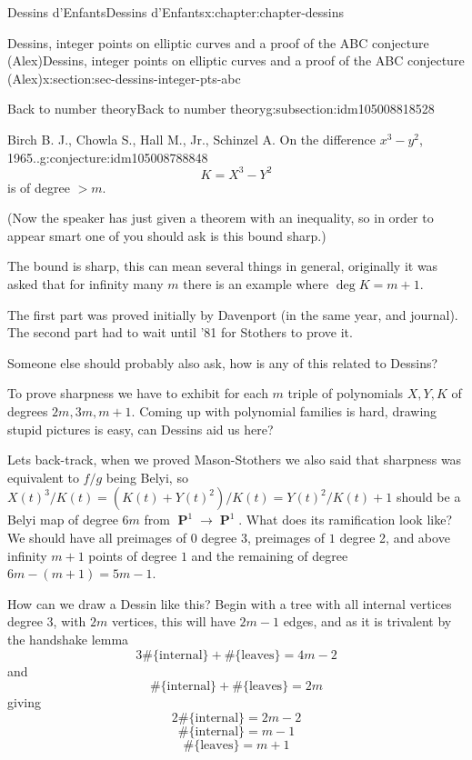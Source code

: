 \documentclass[oneside,10pt,]{book}
\numberwithin{equation}{section}
\DeclareMathOperator{\PP}{\mathbf{P}}
\newcommand{\gt}{>}
\begin{document}
\begin{chapterptx}{Dessins d'Enfants}{}{Dessins d'Enfants}{}{}{x:chapter:chapter-dessins}
\begin{sectionptx}{Dessins, integer points on elliptic curves and a proof of the ABC conjecture (Alex)}{}{Dessins, integer points on elliptic curves and a proof of the ABC conjecture (Alex)}{}{}{x:section:sec-dessins-integer-pts-abc}
\begin{subsectionptx}{Back to number theory}{}{Back to number theory}{}{}{g:subsection:idm105008818528}
\begin{conjecture}{Birch B. J., Chowla S., Hall M., Jr., Schinzel A. On the difference \(x^3 - y^2\), 1965..}{}{g:conjecture:idm105008788848}
\begin{equation*}
K = X^3 - Y^2
\end{equation*}
is of degree \(\gt m\).%
\par
(Now the speaker has just given a theorem with an inequality, so in order to appear smart one of you should ask is this bound sharp.)%
\par
The bound is sharp, this can mean several things in general, originally it was asked that for infinity many \(m\) there is an example where \(\deg K = m + 1\).%
\end{conjecture}
The first part was proved initially by Davenport (in the same year, and journal). The second part had to wait until '81 for Stothers to prove it.%
\par
Someone else should probably also ask, how is any of this related to Dessins?%
\par
To prove sharpness we have to exhibit for each \(m\) triple of polynomials \(X,Y,K\) of degrees \(2m,3m,m+1\). Coming up with polynomial families is hard, drawing stupid pictures is easy, can Dessins aid us here?%
\par
Lets back-track, when we proved Mason-Stothers we also said that sharpness was equivalent to \(f/g\) being Belyi, so \(X(t)^3/K(t) = (K(t) + Y(t)^2) / K(t) = Y(t)^2/K(t) + 1\) should be a Belyi map of degree \(6m\) from \(\PP^1\to \PP^1\). What does its ramification look like? We should have all preimages of \(0\) degree 3, preimages of \(1\) degree 2, and above infinity \(m + 1\) points of degree \(1\) and the remaining of degree \(6m - (m + 1) = 5m - 1\).%
\par
How can we draw a Dessin like this? Begin with a tree with all internal vertices degree 3, with \(2m\) vertices, this will have \(2m - 1\) edges, and as it is trivalent by the handshake lemma%
\begin{equation*}
3 \#\{\text{internal}\} + \#\{\text{leaves}\} =  4m - 2
\end{equation*}
and%
\begin{equation*}
\#\{\text{internal}\} + \#\{\text{leaves}\} =  2m
\end{equation*}
giving%
\begin{equation*}
2\#\{\text{internal}\} =  2m - 2
\end{equation*}
%
\begin{equation*}
\#\{\text{internal}\} =  m - 1
\end{equation*}
%
\begin{equation*}
\#\{\text{leaves}\} =  m + 1

\end{equation*}
\end{subsectionptx}
\end{sectionptx}
\end{chapterptx}
\end{document}
